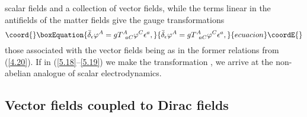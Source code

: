 \documentclass[a4paper,12pt]{article}
\begin{document}
scalar fields and a collection of vector
fields, while the terms linear in
the antifields of the matter fields give
the gauge transformations
\begin{equation}\coord{}\boxEquation{
\bar{\delta}_{\epsilon }\varphi ^{A}=
gT_{\;\;aC}^{A}\varphi ^{C}\epsilon
^{a},  \label{5.19}
}{
\bar{\delta}_{\epsilon }\varphi ^{A}=
gT_{\;\;aC}^{A}\varphi ^{C}\epsilon
^{a},  }{ecuacion}\coordE{}\end{equation}
those associated with the vector fields
being as in the former relations
from (\ref{4.20}). If in
(\ref{5.18}--\ref{5.19}) we make the transformation
\coordHE{},
we arrive at the non-abelian
analogue of scalar electrodynamics.

\subsection{Vector fields coupled to Dirac fields}
\end{document}
